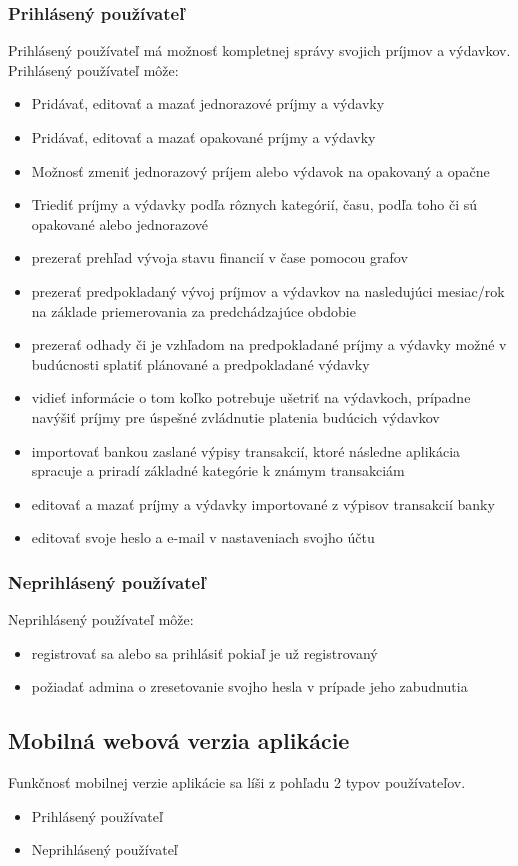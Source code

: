 \documentclass[12pt]{book}
\begin{document}
\subsubsection{Prihlásený používateľ}
Prihlásený používateľ má možnosť kompletnej správy svojich príjmov a výdavkov.
Prihlásený používateľ môže:
\begin{itemize}
\item{Pridávať, editovať a mazať jednorazové príjmy a výdavky}
\item{Pridávať, editovať a mazať opakované príjmy a výdavky}
\item{Možnosť zmeniť jednorazový príjem alebo výdavok na opakovaný a opačne}
\item{Triediť príjmy a výdavky podľa rôznych kategórií, času, podľa toho či sú opakované alebo jednorazové}
\item{prezerať prehľad vývoja stavu financií v čase pomocou grafov}
\item{prezerať  predpokladaný vývoj príjmov a výdavkov na nasledujúci mesiac/rok na základe priemerovania za predchádzajúce obdobie}
\item{prezerať odhady či je vzhľadom na predpokladané príjmy a výdavky možné v budúcnosti splatiť plánované a predpokladané výdavky}
\item{vidieť informácie o tom koľko potrebuje ušetriť na výdavkoch, prípadne navýšiť príjmy pre úspešné zvládnutie platenia budúcich výdavkov}
\item{importovať bankou zaslané výpisy transakcií, ktoré následne aplikácia spracuje a priradí základné kategórie k známym transakciám}
\item{editovať a mazať príjmy a výdavky importované z výpisov transakcií banky}
\item{editovať svoje heslo a e-mail v nastaveniach svojho účtu}
\end{itemize}

\subsubsection{Neprihlásený používateľ}
Neprihlásený používateľ môže:
\begin{itemize}
\item{registrovať sa alebo sa prihlásiť pokiaľ je už registrovaný}
\item{požiadať admina o zresetovanie svojho hesla v prípade jeho zabudnutia}
\end{itemize}
\subsection{Mobilná webová verzia aplikácie}
Funkčnosť mobilnej verzie aplikácie sa líši z pohľadu 2 typov používateľov.
\begin{itemize}
\item{Prihlásený používateľ}
\item{Neprihlásený používateľ}
\end{itemize}
\end{document}
